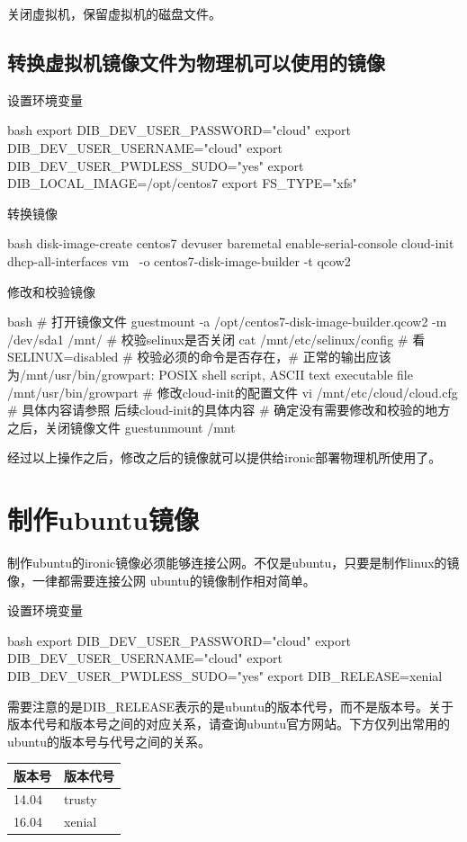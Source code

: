 关闭虚拟机，保留虚拟机的磁盘文件。

\subsection{转换虚拟机镜像文件为物理机可以使用的镜像}

设置环境变量
\begin{code-block}{bash}
export DIB_DEV_USER_PASSWORD="cloud"
export DIB_DEV_USER_USERNAME="cloud"
export DIB_DEV_USER_PWDLESS_SUDO="yes"
export DIB_LOCAL_IMAGE=/opt/centos7
export FS_TYPE="xfs"
\end{code-block}

转换镜像
\begin{code-block}{bash}
disk-image-create centos7 devuser baremetal enable-serial-console cloud-init dhcp-all-interfaces vm \
        -o centos7-disk-image-builder -t qcow2
\end{code-block}

修改和校验镜像
\begin{code-block}{bash}
# 打开镜像文件
guestmount -a /opt/centos7-disk-image-builder.qcow2 -m /dev/sda1 /mnt/
# 校验selinux是否关闭
cat /mnt/etc/selinux/config # 看SELINUX=disabled
# 校验必须的命令是否存在，# 正常的输出应该为/mnt/usr/bin/growpart: POSIX shell script, ASCII text executable
file /mnt/usr/bin/growpart
# 修改cloud-init的配置文件
vi /mnt/etc/cloud/cloud.cfg
# 具体内容请参照 后续cloud-init的具体内容
# 确定没有需要修改和校验的地方之后，关闭镜像文件
guestunmount /mnt
\end{code-block}

经过以上操作之后，修改之后的镜像就可以提供给ironic部署物理机所使用了。

\section{制作ubuntu镜像}
制作ubuntu的ironic镜像必须能够连接公网。不仅是ubuntu，只要是制作linux的镜像，一律都需要连接公网
ubuntu的镜像制作相对简单。

设置环境变量
\begin{code-block}{bash}
export DIB_DEV_USER_PASSWORD="cloud"
export DIB_DEV_USER_USERNAME="cloud"
export DIB_DEV_USER_PWDLESS_SUDO="yes"
export DIB_RELEASE=xenial
\end{code-block}

需要注意的是DIB\_RELEASE表示的是ubuntu的版本代号，而不是版本号。关于版本代号和版本号之间的对应关系，请查询ubuntu官方网站。下方仅列出常用的ubuntu的版本号与代号之间的关系。
\begin{center}
  \begin{tabularx}{\textwidth}{|X|X|}
  \hline
  版本号& 版本代号\\ \hline
  14.04 & trusty \\
  16.04 & xenial \\
  \hline
  \end{tabularx}
  \label{tab:Binary files}
\end{center}

